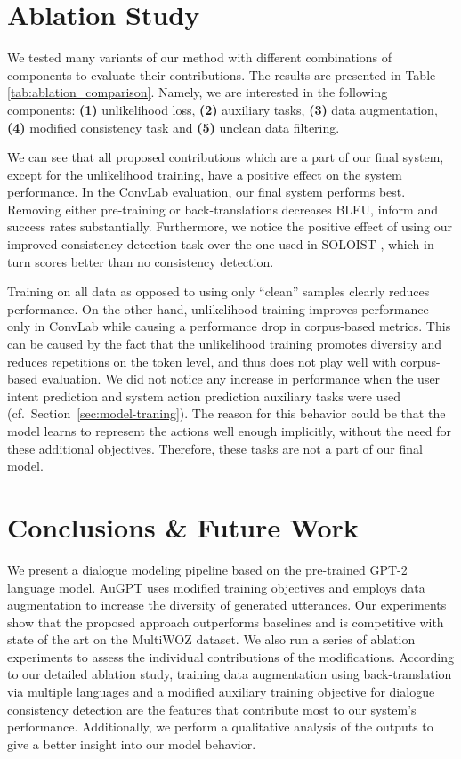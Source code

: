\documentclass[11pt]{article}
\newcommand{\Augpt}[0]{AuGPT\xspace}
\begin{document}
\section{Ablation Study}
\label{sec:ablation}

We tested many variants of our method with different combinations of components to evaluate their contributions. The results are presented in Table \ref{tab:ablation_comparison}.
Namely, we are interested in the following components:
\textbf{(1)} unlikelihood loss, \textbf{(2)} auxiliary tasks, \textbf{(3)} data augmentation, \textbf{(4)}  modified consistency task and \textbf{(5)} unclean data filtering.

We can see that all proposed contributions which are a part of our final system, except for the unlikelihood training, have a positive effect on the system performance.
In the ConvLab evaluation, our final system performs best. 
Removing either pre-training or back-translations decreases BLEU, inform and success rates substantially. Furthermore, we notice the positive effect of using our improved consistency detection task over the one used in SOLOIST \cite{peng2020}, which in turn scores better than no consistency detection. 

Training on all data as opposed to using only “clean” samples clearly reduces performance. On the other hand, unlikelihood training improves performance only in ConvLab while causing a performance drop in corpus-based metrics. This can be caused by the fact that the unlikelihood training promotes diversity and reduces repetitions on the token level, and thus does not play well with corpus-based evaluation. 
We did not notice any increase in performance when the user intent prediction and system action prediction auxiliary tasks were used (cf.\ Section~\ref{sec:model-traning}).
The reason for this behavior could be that the model learns to represent the actions well enough implicitly, without the need for these additional objectives.
Therefore, these tasks are not a part of our final model.

\section{Conclusions \& Future Work}
We present a dialogue modeling pipeline based on the pre-trained GPT-2 language model.
\Augpt uses modified training objectives and employs data augmentation to increase the diversity of generated utterances.
Our experiments show that the proposed approach outperforms baselines and is competitive with state of the art on the MultiWOZ dataset.
We also run a series of ablation experiments to assess the individual contributions of the modifications.
According to our detailed ablation study, 
training data augmentation using back-translation via multiple languages and a modified auxiliary training objective for dialogue consistency detection are the features that contribute most to our system's performance.
Additionally, we perform a qualitative analysis of the outputs to give a better insight into our model behavior.
\end{document}
